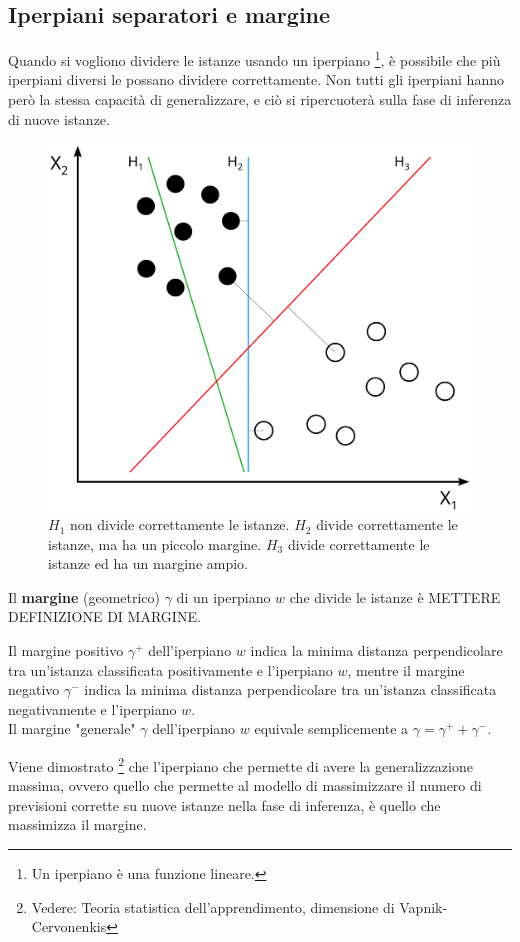 \subsection{Iperpiani separatori e margine}
Quando si vogliono dividere le istanze usando un iperpiano \footnote{Un iperpiano è una funzione lineare.}, è possibile che più iperpiani diversi le possano dividere correttamente.
Non tutti gli iperpiani hanno però la stessa capacità di generalizzare, e ciò si ripercuoterà sulla fase di inferenza di nuove istanze.
\begin{figure}[ht]
    \centering
    \includegraphics[width=0.5\linewidth]{img/hyperplanes.png}
    \caption{$H_1$ non divide correttamente le istanze. $H_2$ divide correttamente le istanze, ma ha un piccolo margine. $H_3$ divide correttamente le istanze ed ha un margine ampio.}
    \label{fig:svm_margin}
\end{figure}
\begin{defn}
    Il \textbf{margine} (geometrico) $\gamma$ di un iperpiano $w$ che divide le istanze è METTERE DEFINIZIONE DI MARGINE. 

    Il margine positivo $\gamma^+$ dell'iperpiano $w$ indica la minima distanza perpendicolare tra un'istanza classificata positivamente e l'iperpiano $w$, mentre il margine negativo $\gamma^-$ indica la minima distanza perpendicolare tra un'istanza classificata negativamente e l'iperpiano $w$.\\
    Il margine "generale" $\gamma$ dell'iperpiano $w$ equivale semplicemente a $\gamma = \gamma^+ + \gamma^-$.
\end{defn}
Viene dimostrato \footnote{Vedere: Teoria statistica dell'apprendimento, dimensione di Vapnik-Cervonenkis} che l'iperpiano che permette di avere la generalizzazione massima, ovvero quello che permette al modello di massimizzare il numero di previsioni corrette su nuove istanze nella fase di inferenza, è quello che massimizza il margine.

